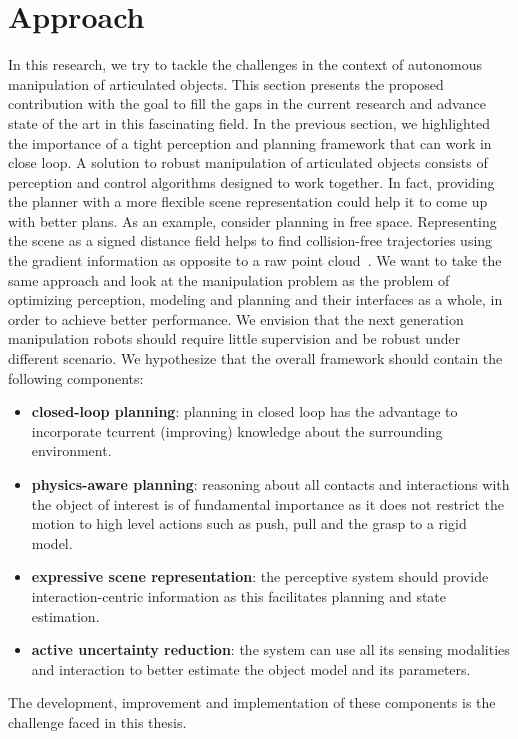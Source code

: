 \section{Approach}
\label{sec:Approach}

In this research, we try to tackle the challenges in the context of autonomous manipulation of articulated objects. This section presents the proposed contribution with the goal to fill the gaps in the current research and advance state of the art in this fascinating field. In the previous section, we highlighted the importance of a tight perception and planning framework that can work in close loop. A solution to robust manipulation of articulated objects consists of perception and control algorithms designed to work together. In fact, providing the planner with a more flexible scene representation could help it to come up with better plans. As an example, consider planning in free space. Representing the scene as a signed distance field helps to find collision-free trajectories using the gradient information as opposite to a raw point cloud~\cite{oleynikova2017voxblox}. We want to take the same approach and look at the manipulation problem as the problem of optimizing perception, modeling and planning and their interfaces as a whole, in order to achieve better performance. We envision that the next generation manipulation robots should require little supervision and be robust under different scenario. We hypothesize that the overall framework should contain the following components:
\begin{itemize}
\item \textbf{closed-loop planning}: planning in closed loop has the advantage to incorporate tcurrent (improving) knowledge about the surrounding environment.
\item \textbf{physics-aware planning}: reasoning about all contacts and interactions with the object of interest is of fundamental importance as it does not restrict the motion to high level actions such as push, pull and the grasp to a rigid model.
\item \textbf{expressive scene representation}: the perceptive system should provide interaction-centric information as this facilitates planning and state estimation.
\item \textbf{active uncertainty reduction}: the system can use all its sensing modalities and interaction to better estimate the object model and its parameters. 
\end{itemize}
The development, improvement and implementation of these components is the challenge faced in this thesis. 

